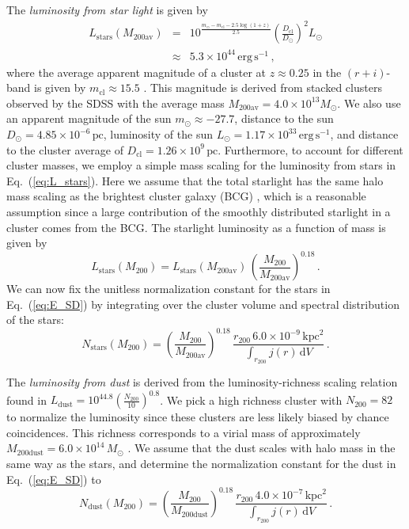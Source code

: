 \documentclass[10pt,aps,pra,reprint,amsmath,amsfonts,amssymb,showpacs,nofootinbib,floatfix]{revtex4-1}
\newcommand{\rmn}{\mathrm}
\newcommand{\clu}{\rmn{cl}}
\newcommand{\msun}{M_\odot}
\newcommand{\stars}{\rmn{stars}}
\newcommand{\dust}{\rmn{dust}}
\newcommand{\kpc}{\rmn{kpc}}
\newcommand{\dd}{\rmn{d}}
\newcommand{\rvir}{r_{200}}
\newcommand{\mvir}{M_{200}}
\begin{document}
The {\em luminosity from star light} is given by
\begin{eqnarray}
L_\stars(M_{200\rmn{av}})&=&10^{\frac{m_\odot-m_\rmn{cl}-2.5\log\left(1+z\right)}{2.5}}
\left(\frac{D_\clu}{D_\odot}\right)^2 L_\odot\nonumber\\
&\approx& 5.3\times10^{44}\,\rmn{erg}\,\rmn{s}^{-1}\,,
\label{eq:L_stars}
\end{eqnarray}
where the average apparent magnitude of a cluster at $z\approx 0.25$
in the $(r+i)$-band is given by $m_\rmn{cl}\approx 15.5$
\cite{2005MNRAS.358..949Z}. This magnitude is derived from stacked
clusters observed by the SDSS with the average mass
$M_{200\rmn{av}}=4.0\times10^{13}\msun$. We also use an apparent
magnitude of the sun $m_\odot\approx -27.7$, distance to the sun
$D_\odot=4.85\times10^{-6}\,\rmn{pc}$, luminosity of the sun
$L_\odot=1.17\times10^{33}\,\rmn{erg\,s}^{-1}$, and distance to the
cluster average of $D_\clu=1.26\times10^9\,\rmn{pc}$. Furthermore, to account for
different cluster masses, we employ a simple mass scaling for the
luminosity from  stars in Eq.~(\ref{eq:L_stars}). Here we assume
that the total starlight has the same halo mass scaling as the
brightest cluster galaxy (BCG) \cite{2010ApJ...713.1037H}, which is a
reasonable assumption since a large contribution of the smoothly distributed
starlight in a cluster comes from the BCG. The starlight luminosity as
a function of mass is given by
\begin{equation}
L_\stars(\mvir)=L_\stars(M_{200\rmn{av}})\,
\left(\frac{\mvir}{M_{200\rmn{av}}}\right)^{0.18}\,.
\label{eq:L_stars_m}
\end{equation} 
We can now fix the unitless normalization constant for the stars in
Eq.~(\ref{eq:E_SD}) by integrating over the cluster volume and
spectral distribution of the stars:
\begin{equation}
 N_\stars(\mvir) = 
\left(\frac{\mvir}{M_{200\rmn{av}}}\right)^{0.18}\,
\frac{\rvir\, 6.0\times10^{-9}\,\kpc^2}{\int_{\rvir} j(r) \,\dd V}\,.
\label{eq:N_stars}
\end{equation}

The {\em luminosity from  dust} is derived from the
luminosity-richness scaling relation found in
\cite{2008A&A...490..547G}
$L_\dust=10^{44.8}\left(\frac{N_{200}}{10}\right)^{0.8}$. We pick a
high richness cluster with $N_{200}=82$ to normalize the luminosity
since these clusters are less likely biased by chance
coincidences. This richness  corresponds to a virial mass of approximately
$M_\rmn{200dust}=6.0\times10^{14}\,\msun$
\cite{2010ApJ...713.1037H}. We assume that the dust scales with halo
mass in the same way as the stars, and determine the normalization
constant for the dust in Eq.~(\ref{eq:E_SD}) to
\begin{equation}
 N_\dust(\mvir) = 
\left(\frac{\mvir}{M_\rmn{200dust}}\right)^{0.18}\,
\frac{\rvir\,4.0\times10^{-7}\,\kpc^2}{\int_{\rvir} j(r) \,\dd V}\,.
\label{eq:N_dust}
\end{equation}
\end{document}
